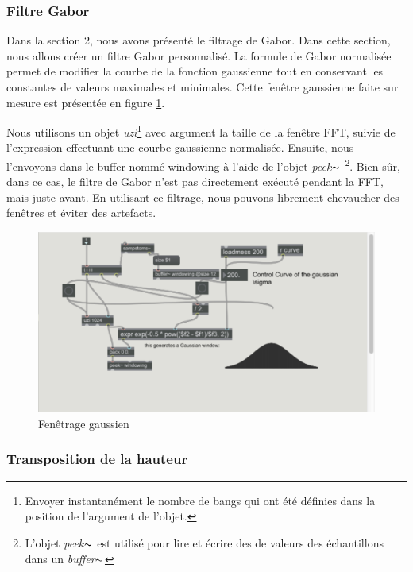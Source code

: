 \subsubsection{Filtre Gabor}

Dans la section 2, nous avons présenté le filtrage de Gabor. Dans cette section, nous allons créer un filtre Gabor personnalisé. La formule de Gabor normalisée permet de modifier la courbe de la fonction gaussienne tout en conservant les constantes de valeurs maximales et minimales. Cette fenêtre gaussienne faite sur mesure est présentée en figure \ref{windowing}.

Nous utilisons un objet \textit{uzi}\footnote{Envoyer instantanément le nombre de \guillemotleft bangs \guillemotright qui ont été définies dans la position de l'argument de l'objet.} avec argument la taille de la fenêtre FFT, suivie de l'expression effectuant une courbe gaussienne normalisée. Ensuite, nous l'envoyons dans le buffer nommé \guillemotleft windowing \guillemotright à l'aide de l'objet \textit{peek}$ \thicksim $ \footnote{L'objet \textit{peek}$ \thicksim $ est utilisé pour lire et écrire des de valeurs des échantillons dans un \textit{buffer}$ \thicksim $ }. Bien sûr, dans ce cas, le filtre de Gabor n’est pas directement exécuté pendant la FFT, mais juste avant. En utilisant ce filtrage, nous pouvons librement chevaucher des fenêtres et éviter des artefacts.
    
    \begin{figure}
        \centering
        \includegraphics[width = \textwidth]{Graphs/windowing.png}
        \caption{Fenêtrage gaussien}
        \label{windowing}
    \end{figure}

\subsubsection{Transposition de la hauteur}

